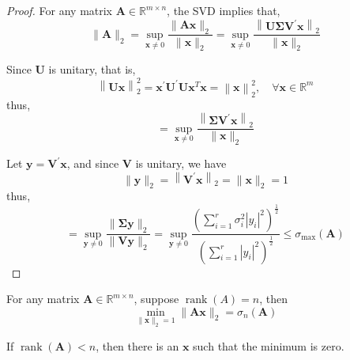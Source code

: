 \begin{proof}
    For any matrix $\mathbf{A}\in\mathbb{R}^{m\times n}$, the SVD implies that,
    \begin{equation*}
        \|\mathbf{A}\|_{2}=\sup_{\mathbf{x}\neq 0}\frac{\|\mathbf{A}\mathbf{x}\|_{2}}{\|\mathbf{x}\|_{2}}=\sup_{\mathbf{x}\neq 0}\frac{\left\|\mathbf{U}\boldsymbol{\Sigma}\mathbf{V}^{\prime}\mathbf{x}\right\|_{2}}{\|\mathbf{x}\|_{2}}
    \end{equation*}

    Since $\mathbf{U}$ is unitary, that is,
    \begin{equation*}
        \left\|\mathbf{U}\mathbf{x}\right\|_{2}^{2}=\mathbf{x}^{\prime}\mathbf{U}^{\prime}\mathbf{U}\mathbf{x}^{T}\mathbf{x}=\left\|\mathbf{x}\right\|_{2}^{2},\quad\forall\mathbf{x}\in\mathbb{R}^{m}
    \end{equation*}
    thus,
    \begin{equation*}
        =\sup_{\mathbf{x}\neq 0}\frac{\left\|\boldsymbol{\Sigma}\mathbf{V}^{\prime}\mathbf{x}\right\|_{2}}{\|\mathbf{x}\|_{2}}
    \end{equation*}

    Let $\mathbf{y}=\mathbf{V}^{\prime}\mathbf{x}$, and since $\mathbf{V}$ is unitary, we have
    \begin{equation*}
        \|\mathbf{y}\|_{2}=\left\|\mathbf{V}^{\prime}\mathbf{x}\right\|_{2}=\|\mathbf{x}\|_{2}=1
    \end{equation*}
    thus,
    \begin{equation*}
        =\sup_{\mathbf{y}\neq 0}\frac{\|\boldsymbol{\Sigma}\mathbf{y}\|_{2}}{\|\mathbf{V}\mathbf{y}\|_{2}}=\sup_{\mathbf{y}\neq 0}\frac{\left(\sum_{i=1}^{r}\sigma_{i}^{2}\left|y_{i}\right|^{2}\right)^{\frac{1}{2}}}{\left(\sum_{i=1}^{r}\left|y_{i}\right|^{2}\right)^{\frac{1}{2}}}\leq\sigma_{\max}(\mathbf{A})
    \end{equation*}
\end{proof}

\begin{theorem}
    For any matrix $\mathbf{A}\in\mathbb{R}^{m\times n}$, suppose $\operatorname{rank}(A)=n$, then
    \begin{equation}
        \min_{\|\mathbf{x}\|_{2}=1}\|\mathbf{A}\mathbf{x}\|_{2}=\sigma_{n}(\mathbf{A})
    \end{equation}
\end{theorem}
\begin{remark}
    If $\operatorname{rank}(\mathbf{A})<n$, then there is an $\mathbf{x}$ such that the minimum is zero.
\end{remark}